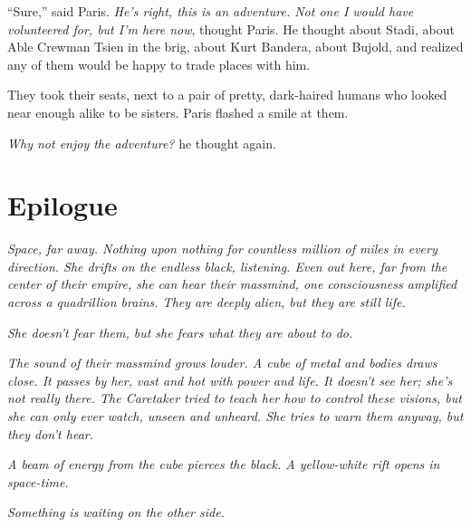 \documentclass[twoside,letterpaper,12pt]{memoir}
\begin{document}
``Sure,” said Paris. \textit{He’s right, this is an adventure. Not one I would have volunteered for, but I’m here now}, thought Paris. He thought about Stadi, about Able Crewman Tsien in the brig, about Kurt Bandera, about Bujold, and realized any of them would be happy to trade places with him. 

They took their seats, next to a pair of pretty, dark-haired humans who looked near enough alike to be sisters. Paris flashed a smile at them. 

\textit{Why not enjoy the adventure? }he thought again. 

\chapter*{Epilogue}

\textit{Space, far away. Nothing upon nothing for countless million of miles in every direction. She drifts on the endless black, listening. Even out here, far from the center of their empire, she can hear their massmind, one consciousness amplified across a quadrillion brains. They are deeply alien, but they are still life.} 

\textit{She doesn’t fear them, but she fears what they are about to do.} 

\textit{The sound of their massmind grows louder. A cube of metal and bodies draws close. It passes by her, vast and hot with power and life. It doesn’t see her; she’s not really there. The Caretaker tried to teach her how to control these visions, but she can only ever watch, unseen and unheard. She tries to warn them anyway, but they don't hear.} 

\textit{A beam of energy from the cube pierces the black. A yellow-white rift opens in space-time.} 

\textit{Something is waiting on the other side.}
\end{document}
